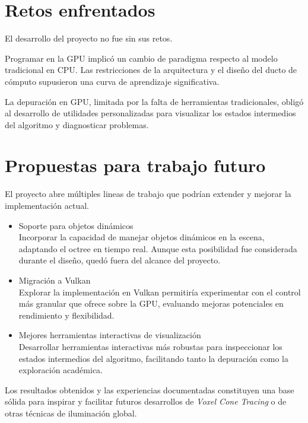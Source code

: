 \section{Retos enfrentados}

El desarrollo del proyecto no fue sin sus retos.

Programar en la GPU implicó un cambio de paradigma respecto al modelo tradicional en CPU.
Las restricciones de la arquitectura y el diseño del ducto de cómputo supusieron una curva de aprendizaje significativa.

La depuración en GPU, limitada por la falta de herramientas tradicionales, obligó al desarrollo de utilidades personalizadas para visualizar los estados intermedios del algoritmo y diagnosticar problemas.

\section{Propuestas para trabajo futuro}

El proyecto abre múltiples lineas de trabajo que podrían extender y mejorar la implementación actual.

\begin{itemize}
    \item Soporte para objetos dinámicos\\
        Incorporar la capacidad de manejar objetos dinámicos en la escena, adaptando el octree en tiempo real.
        Aunque esta posibilidad fue considerada durante el diseño, quedó fuera del alcance del proyecto.
    \item Migración a Vulkan\\
        Explorar la implementación en Vulkan permitiría experimentar con el control más granular que ofrece sobre la GPU, evaluando mejoras potenciales en rendimiento y flexibilidad.
    \item Mejores herramientas interactivas de visualización\\
        Desarrollar herramientas interactivas más robustas para inspeccionar los estados intermedios del algoritmo, facilitando tanto la depuración como la exploración académica.
\end{itemize}

Los resultados obtenidos y las experiencias documentadas constituyen una base sólida para inspirar y facilitar futuros desarrollos de \textit{Voxel Cone Tracing} o de otras técnicas de iluminación global.
